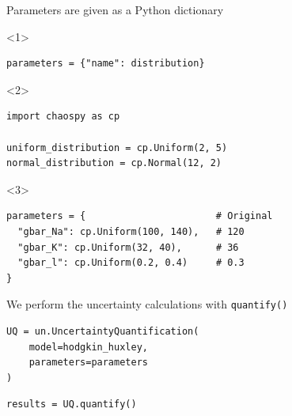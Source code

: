 \documentclass[presentation]{beamer}
\begin{document}

\begin{frame}[fragile]{Parameters are given as a Python dictionary}

  \begin{onlyenv}<1>
    \begin{lstlisting}
parameters = {"name": distribution}
    \end{lstlisting}
  \end{onlyenv}

\begin{onlyenv}<2>
    \begin{lstlisting}
import chaospy as cp

uniform_distribution = cp.Uniform(2, 5)
normal_distribution = cp.Normal(12, 2)
    \end{lstlisting}
  \end{onlyenv}

  \begin{onlyenv}<3>
    \begin{lstlisting}
parameters = {                       # Original
  "gbar_Na": cp.Uniform(100, 140),   # 120
  "gbar_K": cp.Uniform(32, 40),      # 36
  "gbar_l": cp.Uniform(0.2, 0.4)     # 0.3
}
    \end{lstlisting}
  \end{onlyenv}
\end{frame}



\begin{frame}[fragile]{We perform the uncertainty calculations with \lstinline|quantify()|}

\begin{lstlisting}
UQ = un.UncertaintyQuantification(
    model=hodgkin_huxley,
    parameters=parameters
)
\end{lstlisting}

\pause

\begin{lstlisting}
results = UQ.quantify()
\end{lstlisting}

\end{frame}





\end{document}
